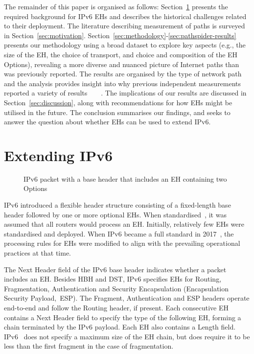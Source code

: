\documentclass[conference]{IEEEtran}
\begin{document}
The remainder of this paper is organised as follows:
Section~\ref{sec:background} presents the required background for IPv6 EHs and
describes the historical challenges related to their deployment.  The
literature describing measurement of paths is surveyed in
Section~\ref{sec:motivation}.
Section~\ref{sec:methodology}-\ref{sec:pathspider-results} presents our
methodology using a broad dataset to explore key aspects (e.g., the size of the
EH, the choice of transport, and choice and composition of the EH Options),
revealing a more diverse and nuanced picture of Internet paths than was
previously reported. The results are organised by the type of network path and
the analysis provides insight into why previous independent measurements
reported a variety of results~\cite{RFC7872}~\cite{apnic}~\cite{nalini-iepg114}~\cite{james}.  The implications of our results are
discussed in Section~\ref{sec:discussion}, along with recommendations for how
EHs might be utilised in the future.  The conclusion summarises our
findings, and seeks to answer the question about whether EHs can be used to
extend IPv6.


\section{Extending IPv6}
\label{sec:background}


\label{sec:ipv6-option-deployment}

\begin{figure}
\centering
  
  \caption{IPv6 packet with a base header that includes an EH containing two Options}
  \label{fig:eh-format}
\end{figure}

IPv6 introduced a flexible header structure
consisting of a fixed-length base header followed by one or more optional EHs.
When standardised~\cite{rfc2460}, it was assumed that all routers would process an EH.
Initially, relatively few EHs were standardised and deployed.  When IPv6
became a full standard in 2017~\cite{rfc8200}, the processing rules for EHs were
modified to align with the prevailing operational practices at that time.

The Next Header field of the IPv6 base header indicates whether a packet
includes an EH.  Besides HBH and DST, IPv6 specifies EHs for Routing, Fragmentation,
Authentication and Security Encapsulation (Encapsulation Security Payload,~ESP).  The Fragment, Authentication and ESP headers operate end-to-end and follow the Routing
header, if present.  Each consecutive EH contains a Next Header field to
specify the type of the following EH, forming a chain terminated by the IPv6
payload. Each EH also contains a Length field.  IPv6~\cite{rfc8200} does not specify a maximum size of the EH chain, but does
require it to be less than the first fragment in the case of fragmentation. 
\end{document}
